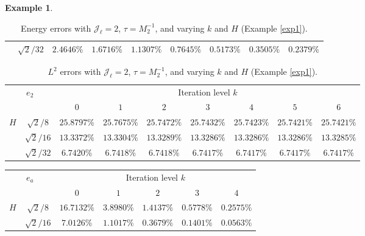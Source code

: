 \documentclass{article}[11pt]
\theoremstyle{definition}
\newtheorem{exmp}{Example}[section]
\begin{document}
\begin{exmp}
\begin{table}[ht]
\begin{tabular}{cc||ccccccc}
\multicolumn{1}{c|}{} &  
$\sqrt{2}/32$ & $2.4646\%$ & $1.6716\%$ & $1.1307\%$ & $0.7645\%$ & $0.5173\%$ & $0.3505\%$ & $0.2379\%$ \\
\hline
\end{tabular}
\caption{Energy errors with $\mathcal{J}_{\ell} = 2$, $\tau = M_2^{-1}$, and varying $k$ and $H$ (Example \ref{exp1}).}
\label{tab:exp1-v-subopt}
\end{table}

\begin{table}[ht]
\centering
\begin{tabular}{cc||ccccccc}
\hline
\multicolumn{2}{c||}{\multirow{2}{*}{$e_2$}}   & \multicolumn{7}{c}{Iteration level $k$}           \\ \cline{3-9} 
\multicolumn{2}{c||}{} &   $0$ & $1$   & $2$   & $3$   & $4$   &$5$ & $6$ \\ 
\hline \hline
\multicolumn{1}{c|}{\multirow{3}{*}{$H$}} & 
$\sqrt{2}/8$ & $25.8797\%$ & $25.7675\%$ & $25.7472\%$ & $25.7432\%$ & $25.7423\%$ & $25.7421\%$ & $25.7421\%$ \\


\multicolumn{1}{c|}{} &  
$\sqrt{2}/16$ & $13.3372\%$ & $13.3304\%$ & $13.3289\%$ & $13.3286\%$ & $13.3286\%$ & $13.3286\%$ & $13.3285\%$ \\

\multicolumn{1}{c|}{} &  
$\sqrt{2}/32$ & $6.7420\%$ & $6.7418\%$ & $6.7418\%$ & $6.7417\%$ & $6.7417\%$ & $6.7417\%$ & $6.7417\%$ \\

\hline
\end{tabular}
\caption{$L^2$ errors with $\mathcal{J}_{\ell} = 2$, $\tau = M_2^{-1}$, and varying $k$ and $H$ (Example \ref{exp1}).}
\label{tab:exp1-p-subopt}
\end{table}

\begin{table}[ht]
\centering
\begin{tabular}{cc||ccccc}
\hline
\multicolumn{2}{c||}{\multirow{2}{*}{$e_a$}}   & \multicolumn{5}{c}{Iteration level $k$}           \\ \cline{3-7} 
\multicolumn{2}{c||}{} &   $0$ & $1$   & $2$   & $3$   & $4$   \\ 
\hline \hline
\multicolumn{1}{c|}{\multirow{3}{*}{$H$}} & 
$\sqrt{2}/8$ & $16.7132\%$ & $3.8980\%$ & $1.4137\%$ & $0.5778\%$ & $0.2575\%$ \\

\multicolumn{1}{c|}{} &  
$\sqrt{2}/16$ & $7.0126\%$ & $1.1017\%$ & $0.3679\%$ & $0.1401\%$ & $0.0563\%$ \\


\end{tabular}
\end{table}
\end{exmp}
\end{document}
